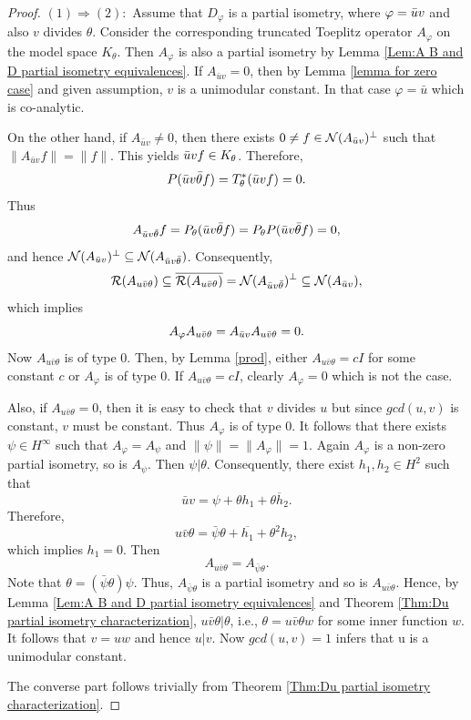 \documentclass[12pt]{amsart}
\newcommand{\cln}{\mathcal{N}}
\newcommand{\clr}{\mathcal{R}}
\newcommand{\h}{{H}^2}
\theoremstyle{definition}
\theoremstyle{plain}
\theoremstyle{definition}
\numberwithin{equation}{section}
\let\phi=\varphi
\begin{document}
\begin{proof} $(1) \Rightarrow (2):$
Assume that $D_{\phi}$ is a partial isometry, where $\phi=\Bar{u}v$ and also $v$ divides $\theta$. Consider the corresponding truncated Toeplitz operator $A_{\phi}$ on the model space $K_{\theta}$. Then $A_{\phi}$ is also a partial isometry by Lemma \ref{Lem:A B and D partial isometry equivalences}. If $A_{\bar{u}v}= 0$, then by Lemma \ref{lemma for zero case} and given assumption, $v$ is a unimodular constant. In that case $\phi=\bar{u}$ which is co-analytic. 

On the other hand, if $A_{\bar{u}v} \neq 0$, then there exists $ 0 \neq f\in \cln(A_{\Bar{u}v})^{\perp}$ such that $\| A_{\bar{u}v} f\| = \|f \|$.
This yields $\Bar{u}vf\in K_{\theta}$. Therefore,
\[
P(\Bar{u}v\Bar{\theta}f) = T_{\theta}^*(\Bar{u}vf)= 0.
\] 
Thus
\[
A_{\Bar{u}v\Bar{\theta}}f = P_{\theta}(\Bar{u}v\Bar{\theta}f)= P_{\theta}P(\Bar{u}v\Bar{\theta}f) =0,
\]
and hence $\cln(A_{\Bar{u}v})^{\perp} \subseteq \cln(A_{\Bar{u}v\Bar{\theta}})$.  Consequently,
\[
\clr(A_{u\Bar{v}\theta})\subseteq \overline{\clr(A_{u\Bar{v}\theta})}=\cln(A_{\Bar{u}v\Bar{\theta}})^{\perp}\subseteq \cln(A_{\Bar{u}v}),
\]
which implies 
\[
A_{\phi}A_{u\Bar{v}\theta} = A_{\Bar{u}v}A_{u\Bar{v}\theta}=0.
\]
Now $A_{u\bar{v}\theta}$ is of type $0$. Then, by Lemma \ref{prod}, either $A_{u\bar{v}\theta} = cI$ for some constant $c$ or $A_\phi$ is of type $0$. If $A_{u\bar{v}\theta}=cI$, clearly $A_\phi = 0$ which is not the case.  

Also, if $A_{u\bar{v}\theta} = 0$, then it is easy to check that $v$ divides $u$ but since $gcd(u,v)$ is constant, $v$ must be constant. Thus $A_\phi$ is of type $0$. It follows that there exists $\psi \in H^\infty$ such that $A_\phi=A_\psi$ and $\|\psi\| =\|A_\phi\|=1$.  Again $A_\phi$ is a non-zero partial isometry, so is $A_\psi$. Then $\psi | \theta$. Consequently, there exist $h_1, h_2 \in \h$ such that
\[
\bar{u}v=\psi+\theta h_1 +\overline{\theta h_2}.
\] 
Therefore,		
\[
u\bar{v}\theta=\bar{\psi}{\theta} +\overline{h_1} + \theta^2 h_2,
\]
which implies $h_1=0$. Then
\[
A_{u\bar{v}\theta}= A_{\bar{\psi}{\theta}}.
\]
Note that $\theta=(\bar{\psi}{\theta}) \psi$. Thus, $A_{\bar{\psi}{\theta}}$ is a partial isometry and so is $A_{u\bar{v}\theta}$. Hence, by Lemma \ref{Lem:A B and D partial isometry equivalences} and Theorem \ref{Thm:Du partial isometry characterization}, $u\bar{v}\theta |\theta$, i.e., $\theta=u\bar{v}\theta w$ for some inner function $w$. 
It follows that $v =uw$ and hence $u|v$. Now $gcd(u,v)=1$ infers that u is a unimodular constant.

The converse part follows trivially from Theorem \ref{Thm:Du partial isometry characterization}.
\end{proof}
	
\end{document}
